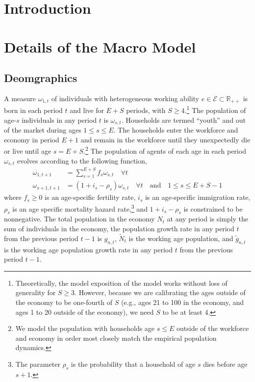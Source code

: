 \documentclass[letterpaper,12pt]{article}
\theoremstyle{definition}
\begin{document}
\begin{spacing}{1.5}


\section{Introduction}\label{Sec_Intro}

\section{Details of the Macro Model}\label{Sec_Macro}

  \subsection{Deomgraphics}
    A measure $\omega_{1,t}$ of individuals with heterogeneous working ability $e \in\mathcal{E}\subset\mathbb{R}_{++}$ is born in each period $t$ and live for $E+S$ periods, with $S\geq 4$.\footnote{Theoretically, the model exposition of the model works without loss of generality for $S\geq 3$. However, because we are calibrating the ages outside of the economy to be one-fourth of $S$ (e.g., ages 21 to 100 in the economy, and ages 1 to 20 outside of the economy), we need $S$ to be at least 4.} The population of age-$s$ individuals in any period $t$ is $\omega_{s,t}$. Households are termed ``youth'' and out of the market during ages $1\leq s\leq E$. The households enter the workforce and economy in period $E+1$ and remain in the workforce until they unexpectedly die or live until age $s=E+S$.\footnote{We model the population with households age $s\leq E$ outside of the workforce and economy in order most closely match the empirical population dynamics.} The population of agents of each age in each period $\omega_{s,t}$ evolves according to the following function,
    \begin{equation}\label{EqPopLawofmotion}
      \begin{split}
        \omega_{1,t+1} &= \sum_{s=1}^{E+S} f_s\omega_{s,t}\quad\forall t \\
        \omega_{s+1,t+1} &= (1 + i_s - \rho_s)\omega_{s,t}\quad\forall t\quad\text{and}\quad 1\leq s \leq E+S-1
      \end{split}
    \end{equation}
    where $f_s\geq 0$ is an age-specific fertility rate, $i_s$ is an age-specific immigration rate, $\rho_s$ is an age specific mortality hazard rate,\footnote{The parameter $\rho_s$ is the probability that a household of age $s$ dies before age $s+1$.} and $1+i_s-\rho_s$ is constrained to be nonnegative. The total population in the economy $N_t$ at any period is simply the sum of individuals in the economy, the population growth rate in any period $t$ from the previous period $t-1$ is $g_{n,t}$, $\tilde{N}_t$ is the working age population, and $\tilde{g}_{n,t}$ is the working age population growth rate in any period $t$ from the previous period $t-1$.

\end{spacing}
\end{document}
